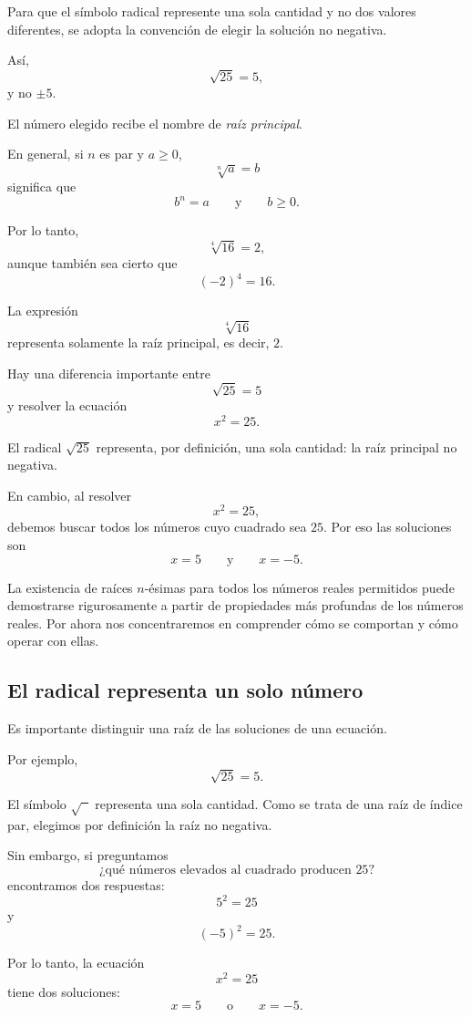 Para que el símbolo radical represente una sola cantidad y no dos valores diferentes, se adopta la convención de elegir la solución no negativa.

Así,
\[
\sqrt{25}=5,
\]
y no \(\pm5\).

El número elegido recibe el nombre de \emph{raíz principal}.

En general, si \(n\) es par y \(a\ge0\),
\[
\sqrt[n]{a}=b
\]
significa que
\[
b^n=a
\qquad\text{y}\qquad
b\ge0.
\]

Por lo tanto,
\[
\sqrt[4]{16}=2,
\]
aunque también sea cierto que
\[
(-2)^4=16.
\]

La expresión
\[
\sqrt[4]{16}
\]
representa solamente la raíz principal, es decir, \(2\).

\begin{note}
Hay una diferencia importante entre
\[
\sqrt{25}=5
\]
y resolver la ecuación
\[
x^2=25.
\]

El radical \(\sqrt{25}\) representa, por definición, una sola cantidad: la raíz principal no negativa.

En cambio, al resolver
\[
x^2=25,
\]
debemos buscar todos los números cuyo cuadrado sea \(25\). Por eso las soluciones son
\[
x=5
\qquad\text{y}\qquad
x=-5.
\]
\end{note}

La existencia de raíces \(n\)-ésimas para todos los números reales permitidos puede demostrarse rigurosamente a partir de propiedades más profundas de los números reales. Por ahora nos concentraremos en comprender cómo se comportan y cómo operar con ellas.

\subsection{El radical representa un solo número}

Es importante distinguir una raíz de las soluciones de una ecuación.

Por ejemplo,
\[
\sqrt{25}=5.
\]

El símbolo \(\sqrt{\phantom a}\) representa una sola cantidad. Como se trata de una raíz de índice par, elegimos por definición la raíz no negativa.

Sin embargo, si preguntamos
\[
\text{¿qué números elevados al cuadrado producen \(25\)?}
\]
encontramos dos respuestas:
\[
5^2=25
\]
y
\[
(-5)^2=25.
\]

Por lo tanto, la ecuación
\[
x^2=25
\]
tiene dos soluciones:
\[
x=5
\qquad\text{o}\qquad
x=-5.
\]


